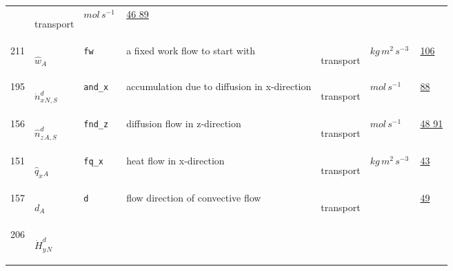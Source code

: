 \begin{longtable}{|p{1cm}|p{2.5cm}|p{4.5cm}|p{8cm}|p{3.0cm}|p{3cm}|p{1cm}|}
             & \begin{lay}transport \end{lay}
             & $ mol \,s^{-1} \, $
             &                 \hyperlink{"e:46"}{ 46 }
                                 \hyperlink{"e:89"}{ 89 }
                 \\
            211
             & \hypertarget{"v:211"}{ $ {{\hat{w}}}{_{A}} $}
             & \verb|fw|
             & a fixed work flow to start with
             & \begin{lay}transport \end{lay}
             & $ kg \,m^{2} \,s^{-3} \, $
             &                 \hyperlink{"e:106"}{ 106 }
                 \\
            195
             & \hypertarget{"v:195"}{ $ {{\dot{n}^d_x}}{_{N, S}} $}
             & \verb|and_x|
             & accumulation due to diffusion in x-direction
             & \begin{lay}transport \end{lay}
             & $ mol \,s^{-1} \, $
             &                 \hyperlink{"e:88"}{ 88 }
                 \\
            156
             & \hypertarget{"v:156"}{ $ {{\hat{n}^{d}_z}}{_{A, S}} $}
             & \verb|fnd_z|
             & diffusion flow in z-direction
             & \begin{lay}transport \end{lay}
             & $ mol \,s^{-1} \, $
             &                 \hyperlink{"e:48"}{ 48 }
                                 \hyperlink{"e:91"}{ 91 }
                 \\
            151
             & \hypertarget{"v:151"}{ $ {{\hat{q}_x}}{_{A}} $}
             & \verb|fq_x|
             & heat flow in x-direction
             & \begin{lay}transport \end{lay}
             & $ kg \,m^{2} \,s^{-3} \, $
             &                 \hyperlink{"e:43"}{ 43 }
                 \\
            157
             & \hypertarget{"v:157"}{ $ {d}{_{A}} $}
             & \verb|d|
             & flow direction of convective flow
             & \begin{lay}transport \end{lay}
             & $  $
             &                 \hyperlink{"e:49"}{ 49 }
                 \\
            206
             & \hypertarget{"v:206"}{ $ {{\dot{H}^d_y}}{_{N}} $}

\end{longtable}
